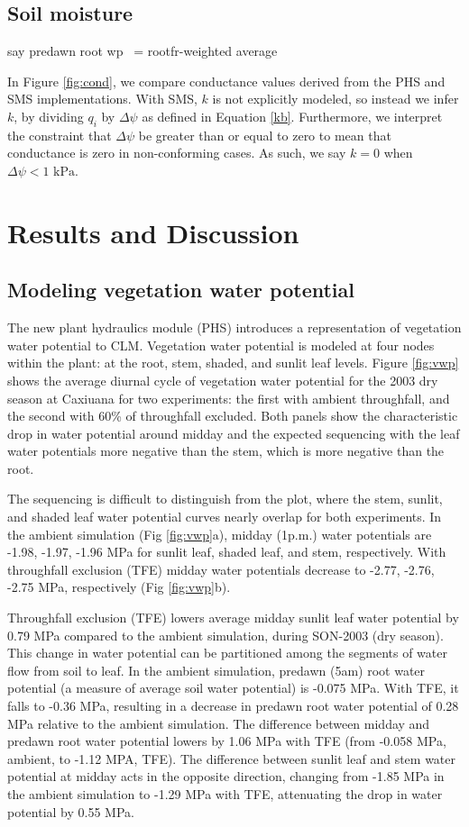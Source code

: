 \documentclass[draft,linenumbers]{agujournal}
\begin{document}
\subsection{Soil moisture}
say predawn root wp ~= rootfr-weighted average


    In Figure \ref{fig:cond}, we compare conductance values derived from the PHS and SMS implementations.
    With SMS, $k$ is not explicitly modeled, so instead we infer $k$, 
    by dividing $q_i$ by $\Delta\psi$ as defined in Equation \ref{kb}.
    Furthermore, we interpret the constraint that $\Delta\psi$ be greater than or equal to zero to mean 
    that conductance is zero in non-conforming cases. As such, we say $k=0$ when $\Delta\psi<\text{1 kPa}$.
    

    
\section{Results and Discussion}
\subsection{Modeling vegetation water potential}

The new plant hydraulics module (PHS) introduces a representation of vegetation water potential to CLM.
Vegetation water potential is modeled at four nodes within the plant: at the root, stem, shaded, and sunlit leaf levels.
Figure \ref{fig:vwp} shows the average diurnal cycle of vegetation water potential for the 2003 dry season at Caxiuana for two experiments:
the first with ambient throughfall, and the second with 60\% of throughfall excluded. 
Both panels show the characteristic drop in water potential around midday and the expected sequencing with 
the leaf water potentials more negative than the stem, which is more negative than the root.

The sequencing is difficult to distinguish from the plot, where the stem, sunlit, and shaded leaf water potential curves nearly overlap for both experiments. 
In the ambient simulation (Fig \ref{fig:vwp}a), midday (1p.m.) water potentials are -1.98, -1.97, -1.96 MPa 
for sunlit leaf, shaded leaf, and stem, respectively.
With throughfall exclusion (TFE)  midday water potentials decrease to -2.77, -2.76, -2.75 MPa, respectively (Fig \ref{fig:vwp}b).

Throughfall exclusion (TFE) lowers average midday sunlit leaf water potential by 0.79 MPa compared to the ambient simulation, during SON-2003 (dry season).
This change in water potential can be partitioned among the segments of water flow from soil to leaf.
In the ambient simulation, predawn (5am) root water potential (a measure of average soil water potential) is -0.075 MPa. 
With TFE, it falls to -0.36 MPa, resulting in a decrease in predawn root water potential of 0.28 MPa relative to the ambient simulation. 
The difference between midday and predawn root water potential lowers by 1.06 MPa with TFE 
(from -0.058 MPa, ambient, to -1.12 MPA, TFE).
The difference between sunlit leaf and stem water potential at midday acts in the opposite direction, changing from
-1.85 MPa in the ambient simulation to -1.29 MPa with TFE, attenuating the drop in water potential by 0.55 MPa.
\end{document}
